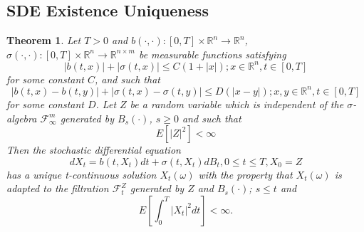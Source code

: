 \documentclass[12pt]{article}
\newtheorem{theorem}{Theorem}[section]
\theoremstyle{definition}
\numberwithin{equation}{section}
\begin{document}
\subsection{SDE Existence Uniqueness}
\label{subsec:SDEExistenceUniqueness}
\begin{theorem}
  Let $T > 0$ and $b(\cdot,\cdot):[0,T] \times \mathbb{R}^n \rightarrow \mathbb{R}^n$, $\sigma(\cdot,\cdot):[0,T] \times \mathbb{R}^n \rightarrow \mathbb{R}^{n \times m}$ be measurable functions satisfying 
  \begin{equation}
    |b(t,x)| + |\sigma(t,x)| \leq C(1+|x|); x \in \mathbb{R}^n, t \in [0,T]
  \end{equation}
  for some constant $C$, and such that 
  \begin{equation}
    |b(t,x) - b(t,y)| + |\sigma(t,x) - \sigma(t,y)| \leq D(|x-y|); x,y \in \mathbb{R}^n, t \in [0,T]
  \end{equation}
  for some constant $D$. Let $Z$ be a random variable which is independent of the $\sigma$-algebra $\mathcal{F}_{\infty}^{m}$ generated by $B_s(\cdot)$, $s\geq 0$ and such that 
  \begin{equation}
    E[|Z|^2] < \infty
  \end{equation}
Then the stochastic differential equation 
\begin{equation}
  dX_t = b(t,X_t)dt + \sigma(t, X_t)dB_t, 0 \leq t \leq T, X_0 = Z
\end{equation}
has a unique t-continuous solution $X_t(\omega)$ with the property that $X_t(\omega)$ is adapted to the filtration $\mathcal{F}_t^Z$ generated by $Z$ and $B_s(\cdot)$; $s \leq t$
and 
\begin{equation}
  E[\int_0^T|X_t|^2dt] < \infty.
\end{equation}

\end{theorem}
\end{document}
